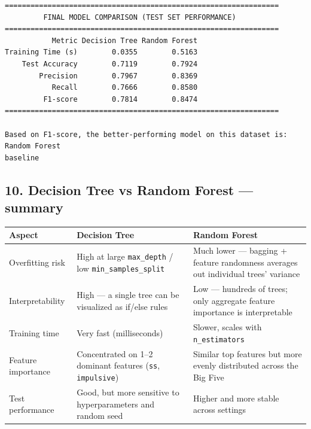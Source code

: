 \documentclass[11pt]{article}
\newcounter{none}
\begin{document}
    \begin{Verbatim}[commandchars=\\\{\}]
================================================================
         FINAL MODEL COMPARISON (TEST SET PERFORMANCE)
================================================================
           Metric Decision Tree Random Forest
Training Time (s)        0.0355        0.5163
    Test Accuracy        0.7119        0.7924
        Precision        0.7967        0.8369
           Recall        0.7666        0.8580
         F1-score        0.7814        0.8474
================================================================

Based on F1-score, the better-performing model on this dataset is: Random Forest
baseline
    \end{Verbatim}

    \subsection{10. Decision Tree vs Random Forest ---
summary}\label{decision-tree-vs-random-forest-summary}

{\def\LTcaptype{none} %
\begin{longtable}[]{@{}
  >{\raggedright\arraybackslash}p{}
  >{\raggedright\arraybackslash}p{}
  >{\raggedright\arraybackslash}p{}@{}}
\toprule\noalign{}
\begin{minipage}[b]{\linewidth}\raggedright
Aspect
\end{minipage} & \begin{minipage}[b]{\linewidth}\raggedright
Decision Tree
\end{minipage} & \begin{minipage}[b]{\linewidth}\raggedright
Random Forest
\end{minipage} \\
\midrule\noalign{}
\endhead
\bottomrule\noalign{}
\endlastfoot
Overfitting risk & High at large \texttt{max\_depth} / low
\texttt{min\_samples\_split} & Much lower --- bagging + feature
randomness averages out individual trees' variance \\
Interpretability & High --- a single tree can be visualized as if/else
rules & Low --- hundreds of trees; only aggregate feature importance is
interpretable \\
Training time & Very fast (milliseconds) & Slower, scales with
\texttt{n\_estimators} \\
Feature importance & Concentrated on 1--2 dominant features
(\texttt{ss}, \texttt{impulsive}) & Similar top features but more evenly
distributed across the Big Five \\
Test performance & Good, but more sensitive to hyperparameters and
random seed & Higher and more stable across settings \\
\end{longtable}
}
\end{document}
